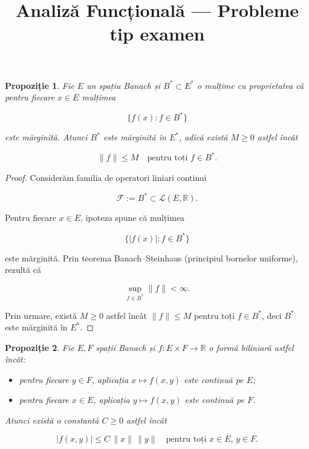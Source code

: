 \documentclass[12pt]{article}
\title{Analiză Funcțională — Probleme tip examen}
\author{}
\date{}
\theoremstyle{definition}
\theoremstyle{plain}
\newtheorem{proposition}{Propoziție}
\begin{document}
\maketitle

\begin{proposition}
Fie $E$ un spațiu Banach și $B^* \subset E^*$ o mulțime cu proprietatea că pentru fiecare $x \in E$ mulțimea


\[
\{ f(x) : f \in B^* \}
\]


este mărginită. Atunci $B^*$ este mărginită în $E^*$, adică există $M \ge 0$ astfel încât


\[
\|f\| \le M \quad \text{pentru toți } f \in B^*.
\]


\end{proposition}

\begin{proof}
Considerăm familia de operatori liniari continui


\[
\mathcal{F} := B^* \subset \mathcal{L}(E,\mathbb{R}).
\]


Pentru fiecare $x \in E$, ipoteza spune că mulțimea


\[
\{ |f(x)| : f \in B^* \}
\]


este mărginită. Prin teorema Banach--Steinhaus (principiul bornelor uniforme), rezultă că


\[
\sup_{f \in B^*} \|f\| < \infty.
\]


Prin urmare, există $M \ge 0$ astfel încât $\|f\| \le M$ pentru toți $f \in B^*$, deci $B^*$ este mărginită în $E^*$.
\end{proof}

\begin{proposition}
Fie $E,F$ spații Banach și $f : E \times F \to \mathbb{R}$ o formă biliniară astfel încât:
\begin{itemize}
  \item pentru fiecare $y \in F$, aplicația $x \mapsto f(x,y)$ este continuă pe $E$;
  \item pentru fiecare $x \in E$, aplicația $y \mapsto f(x,y)$ este continuă pe $F$.
\end{itemize}
Atunci există o constantă $C \ge 0$ astfel încât


\[
|f(x,y)| \le C \,\|x\|\,\|y\| \quad \text{pentru toți } x \in E,\, y \in F.
\]


\end{proposition}
\end{document}
